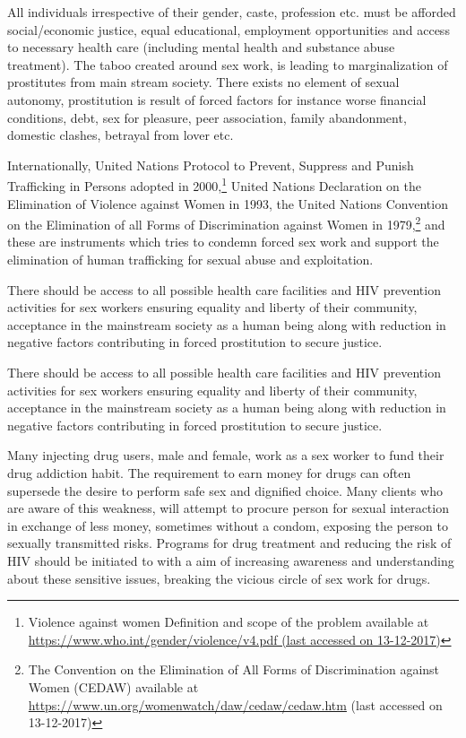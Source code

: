 \begin{multicols}{2}
\newpage


\noi
All individuals irrespective of their gender, caste, profession etc. must be afforded
social/economic justice, equal educational, employment opportunities and access to necessary
health care (including mental health and substance abuse treatment). The taboo created around
sex work, is leading to marginalization of prostitutes from main stream society. There exists no
element of sexual autonomy, prostitution is result of forced factors for instance worse financial
conditions, debt, sex for pleasure, peer association, family abandonment, domestic clashes,
betrayal from lover etc.

\noi
Internationally, United Nations Protocol to Prevent, Suppress and Punish Trafficking in Persons adopted in 2000,\footnote{Violence against women Definition and scope of the problem available at  \url{https://www.who.int/gender/violence/v4.pdf (last accessed on 13-12-2017)}} United Nations Declaration on the Elimination of Violence against Women in 1993, the United Nations Convention on the Elimination of all Forms of Discrimination against Women in 1979,\footnote{The Convention on the Elimination of All Forms of Discrimination against Women (CEDAW) available at \url{https://www.un.org/womenwatch/daw/cedaw/cedaw.htm} (last accessed on 13-12-2017)} and these are instruments which tries to condemn forced sex work and support the elimination of human trafficking for sexual abuse and exploitation.

\noi
There should be access to all possible health care facilities and HIV prevention activities for
sex workers ensuring equality and liberty of their community, acceptance in the mainstream
society as a human being along with reduction in negative factors contributing in forced
prostitution to secure justice.

\noi
There should be access to all possible health care facilities and HIV prevention activities for
sex workers ensuring equality and liberty of their community, acceptance in the mainstream
society as a human being along with reduction in negative factors contributing in forced
prostitution to secure justice.

\noi
Many injecting drug users, male and female, work as a sex worker to fund their drug addiction
habit. The requirement to earn money for drugs can often supersede the desire to perform safe
sex and dignified choice. Many clients who are aware of this weakness, will attempt to procure
person for sexual interaction in exchange of less money, sometimes without a condom,
exposing the person to sexually transmitted risks. Programs for drug treatment and reducing
the risk of HIV should be initiated to with a aim of increasing awareness and understanding
about these sensitive issues, breaking the vicious circle of sex work for drugs.


\end{multicols}
